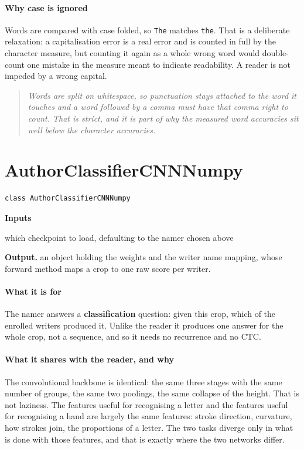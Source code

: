 \paragraph{Why case is ignored}
Words are compared with case folded, so \texttt{The} matches \texttt{the}. That is a deliberate relaxation: a capitalisation error is a real error and is counted in full by the character measure, but counting it again as a whole wrong word would double-count one mistake in the measure meant to indicate readability. A reader is not impeded by a wrong capital.


\begin{quote}\small\itshape Words are split on whitespace, so punctuation stays attached to the word it touches and a word followed by a comma must have that comma right to count. That is strict, and it is part of why the measured word accuracies sit well below the character accuracies.\end{quote}

\section{AuthorClassifierCNNNumpy}
\begin{lstlisting}[style=sig]
class AuthorClassifierCNNNumpy
\end{lstlisting}

\noindent\textbf{Inputs}
\begin{description}[leftmargin=2.2em,style=nextline,font=\normalfont\ttfamily]\setlength\itemsep{1pt}
  \item[{checkpointPath}] \normalfont which checkpoint to load, defaulting to the namer chosen above
\end{description}

\noindent\textbf{Output.} an object holding the weights and the writer name mapping, whose forward method maps a crop to one raw score per writer.


\paragraph{What it is for}
The namer answers a \textbf{classification} question: given this crop, which of the enrolled writers produced it. Unlike the reader it produces one answer for the whole crop, not a sequence, and so it needs no recurrence and no CTC.


\paragraph{What it shares with the reader, and why}
The convolutional backbone is identical: the same three stages with the same number of groups, the same two poolings, the same collapse of the height. That is not laziness. The features useful for recognising a letter and the features useful for recognising a hand are largely the same features: stroke direction, curvature, how strokes join, the proportions of a letter. The two tasks diverge only in what is done with those features, and that is exactly where the two networks differ.


